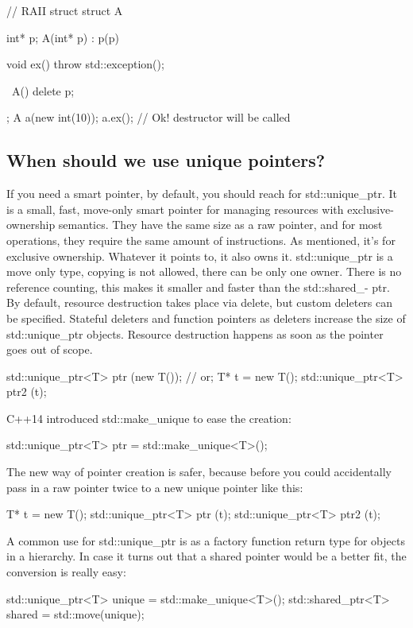 \documentclass{report}
\begin{document}
\bigbreak \noindent 
\begin{cppcode}
// RAII struct
struct A{
    int* p;
    A(int* p) : p(p) { }

    void ex() {
        throw std::exception();
    }

    ~A() {
        delete p;
    }
};
A a(new int(10));
a.ex(); // Ok! destructor will be called
\end{cppcode}

\bigbreak \noindent 
\subsection{When should we use unique pointers?}
\bigbreak \noindent 
If you need a smart pointer, by default, you should reach for
std::unique\_ptr. It is a small, fast, move-only smart pointer for
managing resources with exclusive-ownership semantics.
\bigbreak \noindent 
They have the same size as a raw pointer, and for most operations,
they require the same amount of instructions.
\bigbreak \noindent 
As mentioned, it’s for exclusive ownership. Whatever it points to,
it also owns it. std::unique\_ptr is a move only type, copying is
not allowed, there can be only one owner. There is no reference
counting, this makes it smaller and faster than the std::shared\_-
ptr.
\bigbreak \noindent 
By default, resource destruction takes place via delete, but custom
deleters can be specified. Stateful deleters and function pointers
as deleters increase the size of std::unique\_ptr objects. Resource
destruction happens as soon as the pointer goes out of scope.
\bigbreak \noindent 
\begin{cppcode}
    std::unique_ptr<T> ptr (new T());
    // or;
    T* t = new T();
    std::unique_ptr<T> ptr2 (t);
\end{cppcode}
\bigbreak \noindent 
C++14 introduced std::make\_unique to ease the creation:
\bigbreak \noindent 
\begin{cppcode}
std::unique_ptr<T> ptr = std::make_unique<T>();
\end{cppcode}
\bigbreak \noindent 
The new way of pointer creation is safer, because before you could
accidentally pass in a raw pointer twice to a new unique pointer
like this:
\bigbreak \noindent 
\begin{cppcode}
T* t = new T();
std::unique_ptr<T> ptr (t);
std::unique_ptr<T> ptr2 (t);
\end{cppcode}
\bigbreak \noindent 
A common use for std::unique\_ptr is as a factory function return
type for objects in a hierarchy. In case it turns out that a shared
pointer would be a better fit, the conversion is really easy:
\bigbreak \noindent 
\begin{cppcode}
std::unique_ptr<T> unique = std::make_unique<T>();
std::shared_ptr<T> shared = std::move(unique);
\end{cppcode}
\end{document}
